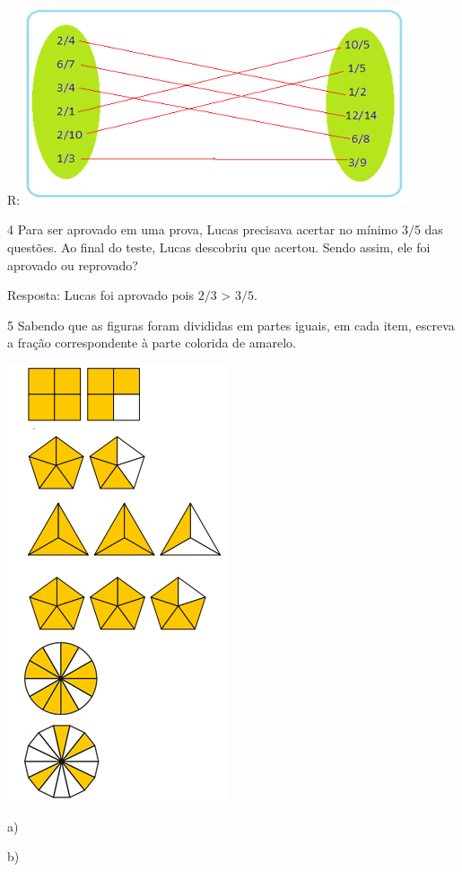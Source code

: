 R:
\includegraphics[width=4.5116in,height=2.28926in]{./imgSAEB_6_MAT/media/image31.png}

\num{4}  Para ser aprovado em uma prova, Lucas precisava acertar no mínimo $3/5$
das questões. Ao final do teste, Lucas descobriu que acertou. Sendo
assim, ele foi aprovado ou reprovado?

Resposta: Lucas foi aprovado pois $2/3$ \textgreater{} $3/5$.

\num{5}  Sabendo que as figuras foram divididas em partes iguais, em cada
item, escreva a fração correspondente à parte colorida de amarelo.

\includegraphics[width=2.57292in,height=5.0625in]{./imgSAEB_6_MAT/media/image32.png}

a)

b)


